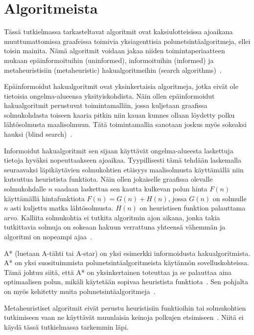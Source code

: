 \section{Algoritmeista}\label{algoritmeista}
Tässä tutkielmassa tarkasteltavat algoritmit ovat kaksiulotteisissa 
ajoaikana muuttumattomissa graafeissa toimivia yksiagenttisia 
polunetsintäalgoritmeja, ellei toisin mainita. Nämä algoritmit voidaan jakaa 
niiden toimintaperiaatteen mukaan epäinformoituihin (uninformed), 
informoituihin (informed) ja metaheuristisiin (metaheuristic) 
hakualgoritmeihin (search algorithms)~\cite{applSciLawande}.\par
	Epäinformoidut hakualgoritmit ovat yksinkertaisia algoritmeja, jotka 
eivät ole tie\-toisia ongelma-alueensa yksityiskohdista. Näin ollen 
epäinformoidut hakualgoritmit perustuvat toimintamalliin, jossa kuljetaan 
graafissa solmukohdasta toiseen kaaria pitkin niin kauan kunnes ollaan 
löydetty polku lähtösolmusta maalisolmuun. Tätä toimintamallia sanotaan joskus 
myös sokeaksi hauksi (blind search)~\cite{applSciLawande}.\par
	Informoidut hakualgoritmit sen sijaan käyttävät ongelma-alueesta 
laskettuja tie\-toja hyväksi nopeuttaakseen ajoaikaa. Tyypillisesti tämä 
tehdään laskemalla seuraavaksi läpikäytävien solmukohtien etäisyys 
maalisolmusta käyttämällä niin kutsuttua heuristista funktiota. Näin ollen 
jokaiselle graafissa olevalle solmukohdalle $n$ saadaan laskettua sen 
kautta kulkevan polun hinta $F(n)$ käyttämällä hintafunktiota 
$F(n) = G(n) + H(n)$, jossa $G(n)$ on solmulle $n$ asti kuljettu matka 
lähtösolmusta. $H(n)$ on heuristisen funktion palauttama arvo. 
Kalliita solmukohtia ei tutkita algoritmin ajon aikana, jonka takia 
tutkittavia solmuja on sokeaan hakuun verrattuna yhteensä vähemmän ja 
algoritmi on nopeampi ajaa~\cite{applSciLawande}.\par
	A* (luetaan A-tähti tai A-star) on yksi esimerkki informoidusta 
hakualgoritmista. A* on yksi suosituimmista polunetsintäalgoritmeista 
käytännön sovelluskoh\-teissa. Tämä johtuu siitä, että A* on yksinkertainen 
toteuttaa ja se palauttaa aina optimaalisen polun, mikäli käytetään 
sopivaa heuristista funktiota~\cite{MathewAndMalathy}. Sen pohjalta on 
myös kehitetty muita polunetsintäalgoritmeja~\cite{applSciLawande}.\par
	Metaheuristiset algoritmit eivät perustu heuristisiin funktioihin tai 
solmukohtien tutkimiseen vaan ne käyttävät muunlaisia keinoja polkujen 
etsimiseen~\cite{applSciLawande}. Niitä ei käydä tässä tutkielmassa tarkemmin 
läpi.

